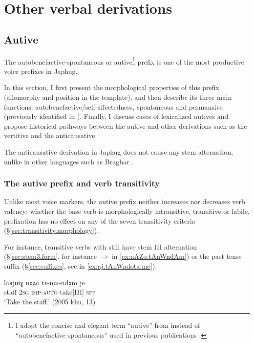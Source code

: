 \chapter{Other verbal derivations} \label{chap:other.derivations}
 
\section{Autive} \label{sec:autobenefactive} 
The autobenefactive-spontaneous or autive\footnote{I adopt the concise and elegant term ``autive'' from \citet{gong18these} instead of ``autobenefactive-spontaneous'' used in previous publications \citep{jacques15spontaneous}. } prefix  is one of the most productive voice prefixes in Japhug. 

In this section, I first present the morphological properties of this prefix (allomorphy and position in the template), and then describe its three main functions: autobenefactive/self-affectedness, spontaneous and permansive (previously identified in \citealt{jacques15spontaneous}). Finally, I discuss cases of lexicalized autives and propose historical pathways between the autive and other derivations such as the vertitive and the anticausative.

The anticausative derivation in Japhug does not cause any stem alternation, unlike in other languages such as Bragbar \citep{zhangshuya20these}.
 
\subsection{The autive prefix and verb transitivity}  \label{sec:autoben.transitivity}
Unlike most voice markers, the autive prefix  neither increases nor decreases verb valency: whether the base verb is morphologically intransitive, transitive or labile,  prefixation has no effect on any of the seven transitivity criteria (§\ref{sec:transitivity.morphology}).

For instance, transitive verbs with  still have stem III alternation (§\ref{sec:stem3.form}, for instance  $\rightarrow$  in \ref{ex:nAZo.tAnWndAm}) or the past tense  suffix (§\ref{sec:suffixes}, see  in \ref{ex:aj.tAnWndota.me}).

 \begin{exe}
\ex \label{ex:nAZo.tAnWndAm}
\gll laʁjɯɣ nɤʑo tɤ-nɯ-ndɤm je  \\
staff \textsc{2sg} \textsc{imp}-\textsc{auto}-take[III] \textsc{sfp} \\
\glt `Take the staff.' (2005 khu, 13) 
\end{exe}

